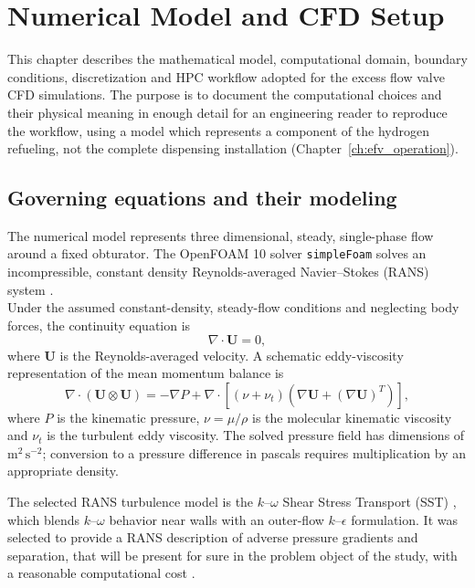 \chapter{Numerical Model and CFD Setup}
\label{ch:numerical_setup}

This chapter describes the mathematical model, computational domain, boundary conditions, discretization and HPC workflow adopted for the excess flow valve CFD simulations. The purpose is to document the computational choices and their physical meaning in enough detail for an engineering reader to reproduce the workflow, using a model which represents a component of the hydrogen refueling, not the complete dispensing installation (Chapter~\ref{ch:efv_operation}).

\section{Governing equations and their modeling}
\label{sec:governing_equations}

The numerical model represents three dimensional, steady, single-phase flow around a fixed obturator. The OpenFOAM 10 solver \texttt{simpleFoam} solves an incompressible, constant density Reynolds-averaged Navier--Stokes (RANS) system \cite{openfoam_user,moukalled2016}. \\
Under the assumed constant-density, steady-flow conditions and neglecting body forces, the continuity equation is
\begin{equation}
    \nabla\cdot\mathbf{U}=0,
    \label{eq:continuity}
\end{equation}
where $\mathbf{U}$ is the Reynolds-averaged velocity. A schematic eddy-viscosity representation of the mean momentum balance is
\begin{equation}
    \nabla\cdot(\mathbf{U}\otimes\mathbf{U})
    =-\nabla P+\nabla\cdot\left[(\nu+\nu_t)
    \left(\nabla\mathbf{U}+(\nabla\mathbf{U})^{T}\right)\right],
    \label{eq:momentum}
\end{equation}
where $P$ is the kinematic pressure, $\nu=\mu/\rho$ is the molecular kinematic viscosity and $\nu_t$ is the turbulent eddy viscosity. The solved pressure field has dimensions of $\mathrm{m^2\,s^{-2}}$; conversion to a pressure difference in pascals requires multiplication by an appropriate density.

The selected RANS turbulence model is the $k$--$\omega$ Shear Stress Transport (SST) \cite{menter1994}, which blends $k$--$\omega$ behavior near walls with an outer-flow $k$--$\epsilon$ formulation.
It was selected to provide a RANS description of adverse pressure gradients and separation, that will be present for sure in the problem object of the study, with a reasonable computational cost \cite{menter1994}.

